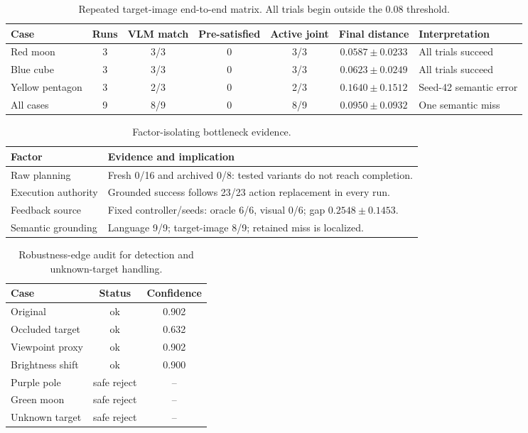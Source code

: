 \documentclass[conference]{IEEEtran}
\begin{document}
\begin{table}[!t]
\centering
\caption{Repeated target-image end-to-end matrix. All trials begin outside the 0.08 threshold.}
\label{tab:targetmatrix}
\scriptsize
\setlength{\tabcolsep}{3pt}
\begin{tabular}{@{}p{}ccccc p{}@{}}
\toprule
Case & Runs & VLM match & Pre-satisfied & Active joint & Final distance & Interpretation \\
\midrule
Red moon & 3 & 3/3 & 0 & 3/3 & $0.0587\pm0.0233$ & All trials succeed \\
Blue cube & 3 & 3/3 & 0 & 3/3 & $0.0623\pm0.0249$ & All trials succeed \\
Yellow pentagon & 3 & 2/3 & 0 & 2/3 & $0.1640\pm0.1512$ & Seed-42 semantic error \\
\midrule
All cases & 9 & 8/9 & 0 & 8/9 & $0.0950\pm0.0932$ & One semantic miss \\
\bottomrule
\end{tabular}
\setlength{\tabcolsep}{6pt}
\end{table}

\begin{table}[!t]
\centering
\caption{Factor-isolating bottleneck evidence.}
\label{tab:symptoms}
\scriptsize
\renewcommand{\arraystretch}{0.90}
\begin{tabular}{@{}p{}@{\hspace{3pt}}p{}@{}}
\toprule
Factor & Evidence and implication \\
\midrule
Raw planning & Fresh 0/16 and archived 0/8: tested variants do not reach completion. \\
Execution authority & Grounded success follows 23/23 action replacement in every run. \\
Feedback source & Fixed controller/seeds: oracle 6/6, visual 0/6; gap $0.2548\pm0.1453$. \\
Semantic grounding & Language 9/9; target-image 8/9; retained miss is localized. \\
\bottomrule
\end{tabular}
\renewcommand{\arraystretch}{1.0}
\end{table}

\begin{table}[!t]
\centering
\caption{Robustness-edge audit for detection and unknown-target handling.}
\label{tab:robust}
\scriptsize
\begin{tabular}{lcc}
\toprule
Case & Status & Confidence \\
\midrule
Original & ok & 0.902 \\
Occluded target & ok & 0.632 \\
Viewpoint proxy & ok & 0.902 \\
Brightness shift & ok & 0.900 \\
Purple pole & safe reject & -- \\
Green moon & safe reject & -- \\
Unknown target & safe reject & -- \\
\bottomrule
\end{tabular}
\end{table}
\end{document}
